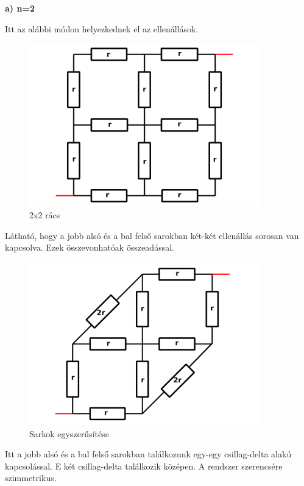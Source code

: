 \documentclass[11pt,a4paper,openany,leqno]{article}
\begin{document}
\textbf{a) n=2}
\medskip

\indent
Itt az alábbi módon helyezkednek el az ellenállások.\\

\begin{figure}[h!]
\centering
  \includegraphics[width=100mm,scale=0.5]{grid_2_1.pdf}
  \caption{2x2 rács}
  \label{}
\end{figure}
\newpage
\indent
Látható, hogy a jobb alsó és a bal felső sarokban két-két ellenállás sorosan van kapcsolva. Ezek összevonhatóak összeadással.\\

\begin{figure}[h!]
\centering
  \includegraphics[width=100mm,scale=0.5]{grid_2_2.pdf}
  \caption{Sarkok egyszerűsítése}
  \label{}
\end{figure}
\newpage
\indent
Itt a jobb alsó és a bal felső sarokban találkozunk egy-egy csillag-delta alakú kapcsolással. E két csillag-delta találkozik középen. A rendszer szerencsére szimmetrikus. \\
\end{document}
